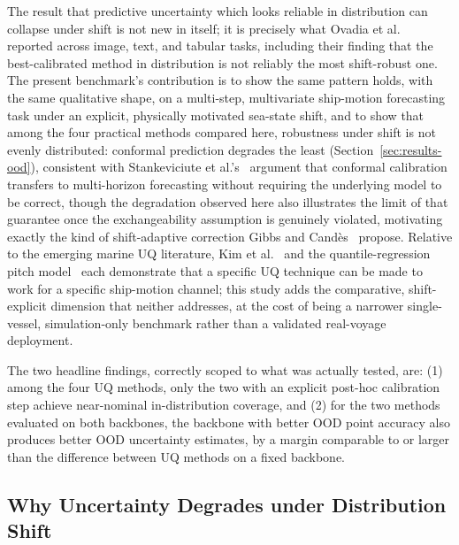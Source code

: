 \documentclass[a4paper,fleqn]{cas-sc}
\begin{document}
The result that predictive uncertainty which looks reliable in distribution can collapse under shift is not new in itself; it is precisely what Ovadia et al.~\cite{ovadia2019can} reported across image, text, and tabular tasks, including their finding that the best-calibrated method in distribution is not reliably the most shift-robust one. The present benchmark's contribution is to show the same pattern holds, with the same qualitative shape, on a multi-step, multivariate ship-motion forecasting task under an explicit, physically motivated sea-state shift, and to show that among the four practical methods compared here, robustness under shift is not evenly distributed: conformal prediction degrades the least (Section~\ref{sec:results-ood}), consistent with Stankeviciute et al.'s~\cite{stankeviciute2021conformal} argument that conformal calibration transfers to multi-horizon forecasting without requiring the underlying model to be correct, though the degradation observed here also illustrates the limit of that guarantee once the exchangeability assumption is genuinely violated, motivating exactly the kind of shift-adaptive correction Gibbs and Candès~\cite{gibbs2021adaptive} propose. Relative to the emerging marine UQ literature, Kim et al.~\cite{kim2025mcdropoutroll} and the quantile-regression pitch model~\cite{aei2022qrnnpitch} each demonstrate that a specific UQ technique can be made to work for a specific ship-motion channel; this study adds the comparative, shift-explicit dimension that neither addresses, at the cost of being a narrower single-vessel, simulation-only benchmark rather than a validated real-voyage deployment.

The two headline findings, correctly scoped to what was actually tested, are: (1) among the four UQ methods, only the two with an explicit post-hoc calibration step achieve near-nominal in-distribution coverage, and (2) for the two methods evaluated on both backbones, the backbone with better OOD point accuracy also produces better OOD uncertainty estimates, by a margin comparable to or larger than the difference between UQ methods on a fixed backbone.

\subsection{Why Uncertainty Degrades under Distribution Shift}
\end{document}

